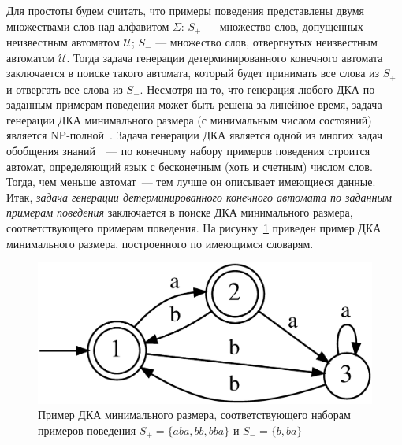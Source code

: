 Для простоты будем считать, что примеры поведения представлены двумя множествами слов над алфавитом $\Sigma$: $S_{+}$ — множество слов, допущенных неизвестным автоматом $\mathcal{U}$; $S_{-}$ — множество слов, отвергнутых неизвестным автоматом $\mathcal{U}$.
Тогда задача генерации детерминированного конечного автомата заключается в поиске такого автомата, который будет принимать все слова из $S_{+}$ и отвергать все слова из $S_{-}$.
Несмотря на то, что генерация любого ДКА по заданным примерам поведения может быть решена за линейное время, задача генерации ДКА минимального размера (с минимальным числом состояний) является NP-полной~\cite{DBLP:journals/iandc/Gold78}.
Задача генерации ДКА является одной из многих задач обобщения знаний~\cite{banich2011generalization}~--- по конечному набору примеров поведения строится автомат, определяющий язык с бесконечным (хоть и счетным) числом слов.
Тогда, чем меньше автомат~--- тем лучше он описывает имеющиеся данные.
Итак, \emph{задача генерации детерминированного конечного автомата по заданным примерам поведения} заключается в поиске ДКА минимального размера, соответствующего примерам поведения.
На рисунку~\ref{img:dfa-ex} приведен пример ДКА минимального размера, построенного по имеющимся словарям. 

\begin{figure}[ht]
  \centering
  \includegraphics[scale=0.16]{img/datamod/FIG1.eps}
  \caption{Пример ДКА минимального размера, соответствующего наборам примеров поведения $S_{+} = \{aba, bb, bba\}$ и $S_{-} = \{b, ba\}$}
  \label{img:dfa-ex}
\end{figure}


